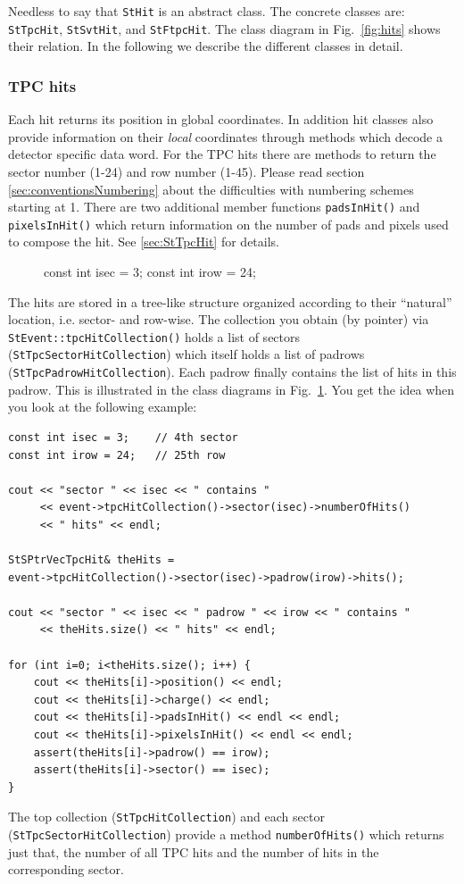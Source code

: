 \documentclass[twoside]{article}
\begin{document}
Needless to say that \texttt{StHit} is an abstract class. The concrete
classes are: \texttt{StTpcHit}, \texttt{StSvtHit}, and
\texttt{StFtpcHit}. The class diagram in Fig.~\ref{fig:hits} shows
their relation. In the following we describe the different classes in
detail.

\subsubsection{TPC hits}
  
  Each hit returns its position in global
coordinates. In addition hit classes also provide information on their
\emph{local} coordinates through methods which decode a detector
specific data word. For the TPC hits there are methods to return the
sector number (1-24) and row number (1-45).  Please read section
\ref{sec:conventionsNumbering} about the difficulties with numbering
schemes starting at 1.  There are two additional member functions
\texttt{padsInHit()} and \texttt{pixelsInHit()} which return
information on the number of pads and pixels used to compose the hit.
See \ref{sec:StTpcHit} for details.
\begin{figure}[htb]
    \begin{center}
const int isec = 3;
const int irow = 24;
        \label{fig:tpc}
    \end{center}
\end{figure}

The hits are stored in a tree-like structure organized
according to their ``natural'' location, i.e. sector- and row-wise.
The collection you obtain (by pointer) via
\texttt{StEvent::tpcHitCollection()} holds a list of sectors
(\texttt{StTpcSectorHitCollection}) which itself holds a list of padrows
(\texttt{StTpcPadrowHitCollection}). Each padrow finally contains the list of
hits in this padrow. This is illustrated in the class diagrams in
Fig.~\ref{fig:tpc}. You get the idea when you look at the following
example:
\begin{verbatim}
const int isec = 3;    // 4th sector
const int irow = 24;   // 25th row

cout << "sector " << isec << " contains "
     << event->tpcHitCollection()->sector(isec)->numberOfHits()
     << " hits" << endl;

StSPtrVecTpcHit& theHits =
event->tpcHitCollection()->sector(isec)->padrow(irow)->hits();

cout << "sector " << isec << " padrow " << irow << " contains "
     << theHits.size() << " hits" << endl;

for (int i=0; i<theHits.size(); i++) {
    cout << theHits[i]->position() << endl;
    cout << theHits[i]->charge() << endl;
    cout << theHits[i]->padsInHit() << endl << endl;
    cout << theHits[i]->pixelsInHit() << endl << endl;
    assert(theHits[i]->padrow() == irow);
    assert(theHits[i]->sector() == isec);
}
\end{verbatim}
The top collection (\texttt{StTpcHitCollection}) and each sector 
(\texttt{StTpcSectorHitCollection}) provide a method
\texttt{numberOfHits()} which returns just that, the number of all TPC
hits and the number of hits in the corresponding sector.
\end{document}
